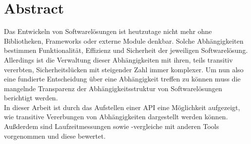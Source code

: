 \section{Abstract} \label{sec:abstract}
Das Entwickeln von Softwarelösungen ist heutzutage nicht mehr ohne Bibliotheken, Frameworks oder externe Module denkbar.
Solche Abhängigkeiten bestimmen Funktionalität, Effizienz und Sicherheit der jeweiligen Softwarelösung.
Allerdings ist die Verwaltung dieser Abhängigkeiten mit ihren, teils transitiv vererbten, Sicherheitslücken mit steigender Zahl immer komplexer.
Um nun also eine fundierte Entscheidung über eine Abhängigkeit treffen zu können muss die mangelnde Transparenz der Abhängigkeitsstruktur von Softwarelösungen berichtigt werden.
\\
In dieser Arbeit ist durch das Aufstellen einer API eine Möglichkeit aufgezeigt, wie transitive Vererbungen von Abhängigkeiten dargestellt werden können.
Außderdem sind Laufzeitmessungen sowie -vergleiche mit anderen Tools vorgenommen und diese bewertet.